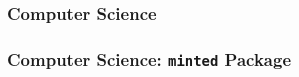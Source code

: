\begin{frame}
\frametitle{Computer Science}
    
\end{frame}


\begin{frame}
\frametitle{Computer Science: \texttt{minted} Package}
    
\end{frame}